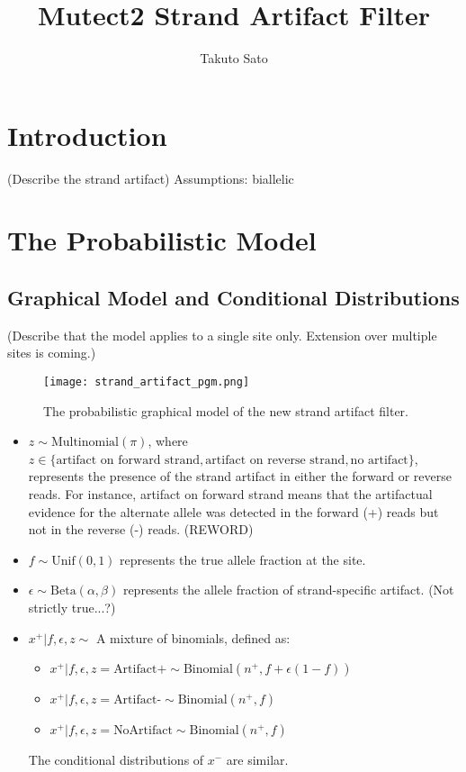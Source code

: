 \documentclass[a4paper]{article}
\title{Mutect2 Strand Artifact Filter}
\author{Takuto Sato}
\begin{document}
\maketitle

\section{Introduction}

(Describe the strand artifact)
Assumptions: 
biallelic

\section{The Probabilistic Model}
\subsection{Graphical Model and Conditional Distributions}

(Describe that the model applies to a single site only. Extension over multiple sites is coming.)

\begin{figure}
\centering
\texttt{[image: strand\_artifact\_pgm.png]}
\caption{\label{fig:frog}The probabilistic graphical model of the new strand artifact filter.}
\end{figure}

\begin{itemize}
	\item $z \sim \text{Multinomial}(\pi)$, where $z  \in \{ \text{artifact on forward strand}, \text{artifact on reverse strand}, \text{no artifact} \}$, represents the presence of the strand artifact in either the forward or reverse reads. For instance, artifact on forward strand means that the artifactual evidence for the alternate allele was detected in the forward (+) reads but not in the reverse (-) reads. (REWORD)
	\item $f \sim \text{Unif}(0, 1)$ represents the true allele fraction at the site.
	\item $\epsilon \sim \text{Beta}(\alpha, \beta)$ represents the allele fraction of strand-specific artifact. (Not strictly true...?)
	\item $x^+ | f, \epsilon, z \sim$ A mixture of binomials, defined as:
		\begin{itemize}
			\item $x^+ | f, \epsilon, z = \text{Artifact+} \sim \text{Binomial} (n^+, f + \epsilon(1-f))$
			\item $x^+ | f, \epsilon, z = \text{Artifact-} \sim \text{Binomial} (n^+, f)$
			\item $x^+ | f, \epsilon, z = \text{NoArtifact} \sim \text{Binomial} (n^+, f)$
		\end{itemize}
		The conditional distributions of $x^-$ are similar.
\end{itemize}
\end{document}
